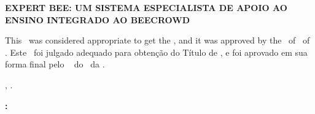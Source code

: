 


\begin{folhadeaprovacao}

    \begin{center}
        {\imprimirautor}

        \begin{center}
            \ABNTEXchapterfont\bfseries\MakeUppercase{Expert Bee: Um Sistema Especialista de Apoio ao Ensino Integrado ao Beecrowd}\ifnotempty{\imprimirsubtitulo}{: \imprimirsubtitulo}
        \end{center}

        \begin{minipage}{\textwidth}
            \lang
            {
                This \imprimirtipotrabalho~was considered appropriate to get the \imprimirformacao,
                and it was approved by the \imprimirprograma~of \imprimircentro~of \imprimirinstituicao.
            }
            {
                Este \imprimirtipotrabalho~foi julgado adequado para obtenção do Título de \imprimirformacao,
                e foi aprovado em sua forma final pelo \imprimirprograma~
                do \imprimircentro~da \imprimirinstituicao.
            }
         \end{minipage}%
    \end{center}

    \begin{center}
        \imprimirlocal, \imprimirdata.
    \end{center}


    \vspace*{1cm}

    \begin{flushleft}
        \textbf{:}
    \end{flushleft}

    \vspace*{0.5cm}

    \begin{center}
        \assinatura{%
            \textbf{\imprimirorientador} \\ \imprimirorientadorRotulo\\
            \imprimirinstituicao~--~\imprimirinstituicaosigla
        }
        \vspace*{0.5cm}


\end{center}
\end{folhadeaprovacao}
